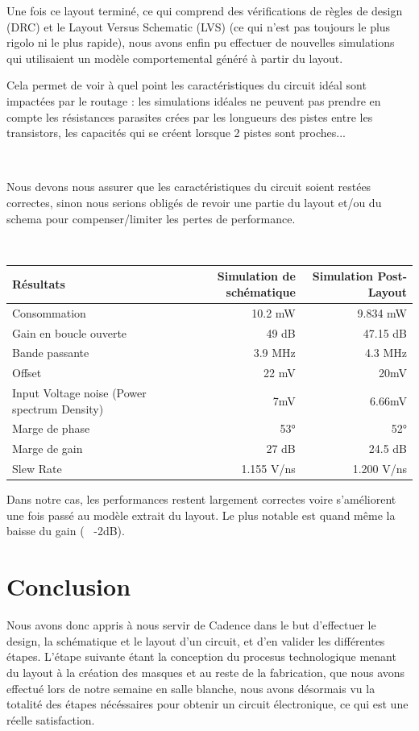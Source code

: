 \documentclass{article}
\begin{document}
Une fois ce layout terminé, ce qui comprend des vérifications de règles de design (DRC) et le Layout Versus Schematic (LVS) (ce qui n’est pas toujours le plus rigolo ni le plus rapide), nous avons enfin pu effectuer de nouvelles simulations qui utilisaient un modèle comportemental généré à partir du layout.

Cela permet de voir à quel point les caractéristiques du circuit idéal sont impactées par le routage : les simulations idéales ne peuvent pas prendre en compte les résistances parasites crées par les longueurs des pistes entre les transistors, les capacités qui se créent lorsque 2 pistes sont proches...

~

Nous devons nous assurer que les caractéristiques du circuit soient restées correctes, sinon nous serions obligés de revoir une partie du layout et/ou du schema pour compenser/limiter les pertes de performance.

~

\begin{tabular}{|l|r|r|}
    \hline
    Résultats & Simulation de schématique & Simulation Post-Layout \\
    \hline
    Consommation & 10.2 mW & 9.834 mW \\
    \hline
    Gain en boucle ouverte & 49 dB & 47.15 dB \\
    \hline
    Bande passante & 3.9 MHz & 4.3 MHz \\
    \hline
    Offset & 22 mV & 20mV \\
    \hline
    Input Voltage noise (Power spectrum Density) & 7mV & 6.66mV \\
    \hline
    Marge de phase & 53° & 52° \\
    \hline
    Marge de gain & 27 dB & 24.5 dB \\
    \hline
    Slew Rate & 1.155 V/ns & 1.200 V/ns \\
    \hline
\end{tabular}

Dans notre cas, les performances restent largement correctes voire s'améliorent une fois passé au modèle extrait du layout. Le plus notable est quand même la baisse du gain (~ -2dB).


\section*{Conclusion}

Nous avons donc appris à nous servir de Cadence dans le but d’effectuer le design, la schématique et le layout d’un circuit, et d’en valider les différentes étapes. L’étape suivante étant la conception du procesus technologique menant du layout à la création des masques et au reste de la fabrication, que nous avons effectué lors de notre semaine en salle blanche, nous avons désormais vu la totalité des étapes nécéssaires pour obtenir un circuit électronique, ce qui est une réelle satisfaction.
\end{document}
